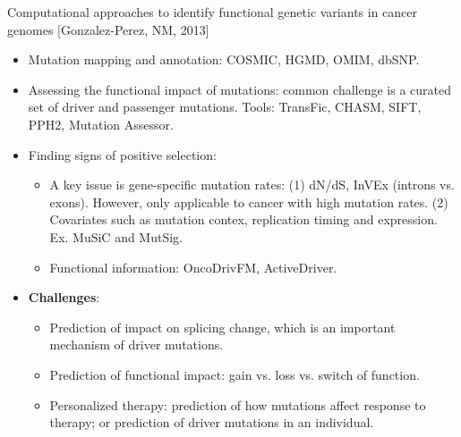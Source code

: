 \documentclass{report}
\begin{document}
Computational approaches to identify functional genetic variants in cancer genomes [Gonzalez-Perez, NM, 2013]
\begin{itemize}
	\item Mutation mapping and annotation: COSMIC, HGMD, OMIM, dbSNP. 
	
	\item Assessing the functional impact of mutations: common challenge is a curated set of driver and passenger mutations. Tools: TransFic, CHASM, SIFT, PPH2, Mutation Assessor. 
	
	\item Finding signs of positive selection: 
	\begin{itemize}
		\item A key issue is gene-specific mutation rates: (1) dN/dS, InVEx (introns vs. exons). However, only applicable to cancer with high mutation rates. (2) Covariates such as mutation contex, replication timing and expression. Ex. MuSiC and MutSig. 
		
		\item Functional information: OncoDrivFM, ActiveDriver. 
	\end{itemize}	
	
	\item \textbf{Challenges}: 
	\begin{itemize}
		\item Prediction of impact on splicing change, which is an important mechanism of driver mutations. 
		\item Prediction of functional impact: gain vs. loss vs. switch of function. 
		\item Personalized therapy: prediction of how mutations affect response to therapy; or prediction of driver mutations in an individual. 
	\end{itemize}
	
\end{itemize}
\end{document}
